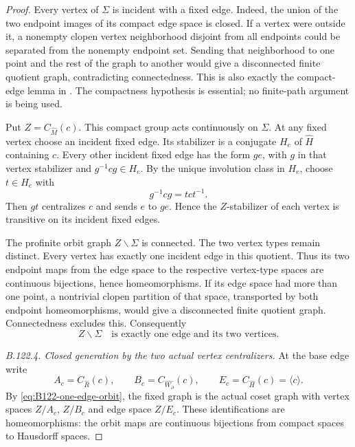 \begin{proof}
Every vertex of $\Sigma$ is incident with a fixed edge. Indeed,
the union of the two endpoint images of its compact edge space is
closed. If a vertex were outside it, a nonempty clopen vertex
neighborhood disjoint from all endpoints could be separated from
the nonempty endpoint set. Sending that neighborhood to one point
and the rest of the graph to another would give a disconnected
finite quotient graph, contradicting connectedness. This is also
exactly the compact-edge lemma in
\citet[Lemma~2.14]{B_ZalesskiiMelnikov1989}. The compactness
hypothesis is essential; no finite-path argument is being used.

Put $Z=C_{\widehat M}(c)$. This compact group acts continuously
on $\Sigma$. At any fixed vertex choose an incident fixed edge.
Its stabilizer is a conjugate $H_e$ of $\widehat H$ containing
$c$. Every other incident fixed edge has the form $g e$, with
$g$ in that vertex stabilizer and $g^{-1}cg\in H_e$. By the
unique involution class in $H_e$, choose $t\in H_e$ with
\[
 g^{-1}cg=tct^{-1}.
\]
Then $gt$ centralizes $c$ and sends $e$ to $ge$. Hence the
$Z$-stabilizer of each vertex is transitive on its incident fixed
edges.

The profinite orbit graph $Z\backslash\Sigma$ is connected.
The two vertex types remain distinct. Every vertex has exactly
one incident edge in this quotient. Thus its two endpoint maps
from the edge space to the respective vertex-type spaces are
continuous bijections, hence homeomorphisms. If its edge space
had more than one point, a nontrivial clopen partition of that
space, transported by both endpoint homeomorphisms, would give
a disconnected finite quotient graph. Connectedness excludes
this. Consequently
\begin{equation}\label{eq:B122-one-edge-orbit}
 Z\backslash\Sigma\quad\text{is exactly one edge and its two vertices}.
\end{equation}

\emph{B.122.4. Closed generation by the two actual vertex centralizers.}
At the base edge write
\[
 A_c=C_{\widehat R}(c),\qquad
 B_c=C_{\widehat{W_{\partial}}}(c),\qquad
 E_c=C_{\widehat H}(c)=\langle c\rangle.
\]
By \eqref{eq:B122-one-edge-orbit}, the fixed graph is the actual
coset graph with vertex spaces $Z/A_c$, $Z/B_c$ and edge space
$Z/E_c$. These identifications are homeomorphisms: the orbit
maps are continuous bijections from compact spaces to Hausdorff
spaces.


\end{proof}
